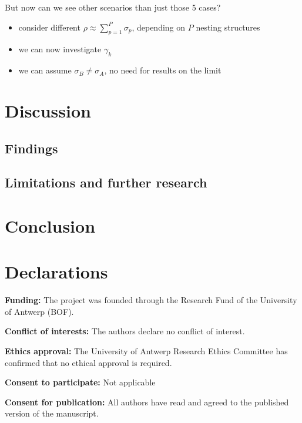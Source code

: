 \documentclass[
  authoryear,
  preprint,
  1p]{elsarticle}
\providecommand{\tightlist}{%
  \setlength{\itemsep}{0pt}\setlength{\parskip}{0pt}}\usepackage{longtable,booktabs,array}
\begin{document}
But now can we see other scenarios than just those 5 cases?

\begin{itemize}
\tightlist
\item
  consider different \(\rho \approx \sum_{p=1}^{P} \sigma_{p}\),
  depending on \(P\) nesting structures
\item
  we can now investigate \(\gamma_{k}\)
\item
  we can assume \(\sigma_{B} \neq \sigma_{A}\), no need for results on
  the limit
\end{itemize}

\section{Discussion}\label{sec-discuss}

\subsection{Findings}\label{sec-discuss-finding}

\subsection{Limitations and further
research}\label{sec-discuss-limitations}

\section{Conclusion}\label{sec-conclusion}

\newpage{}

\section*{Declarations}\label{declarations}

\textbf{Funding:} The project was founded through the Research Fund of
the University of Antwerp (BOF).

\textbf{Conflict of interests:} The authors declare no conflict of
interest.

\textbf{Ethics approval:} The University of Antwerp Research Ethics
Committee has confirmed that no ethical approval is required.

\textbf{Consent to participate:} Not applicable

\textbf{Consent for publication:} All authors have read and agreed to
the published version of the manuscript.
\end{document}
